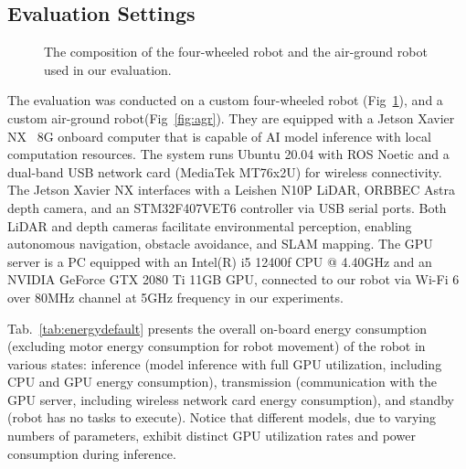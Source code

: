 \subsection{Evaluation Settings}

\begin{figure}[!t]
    \centering
    \hfil
    \caption{The composition of the four-wheeled robot and the air-ground robot used in our evaluation.}
    \label{fig:robot}
\end{figure}

The evaluation was conducted on a custom four-wheeled robot (Fig~\ref{fig:robot}), and a custom air-ground robot(Fig~\ref{fig:agr}).
They are equipped with a Jetson Xavier NX~\cite{jetsonnx} 8G onboard computer that is capable of AI model inference with local computation resources. 
The system runs Ubuntu 20.04 with ROS Noetic and a dual-band USB network card (MediaTek MT76x2U) for wireless connectivity. 
The Jetson Xavier NX interfaces with a Leishen N10P LiDAR, ORBBEC Astra depth camera, and an STM32F407VET6 controller via USB serial ports. 
Both LiDAR and depth cameras facilitate environmental perception, enabling autonomous navigation, obstacle avoidance, and SLAM mapping. 
The GPU server is a PC equipped with an Intel(R) i5 12400f CPU @ 4.40GHz and an NVIDIA GeForce GTX 2080 Ti 11GB GPU, connected to our robot via Wi-Fi 6 over 80MHz channel at 5GHz frequency in our experiments.

Tab.~\ref{tab:energydefault} presents the overall on-board energy consumption (excluding motor energy consumption for robot movement) of the robot in various states: inference (model inference with full GPU utilization, including CPU and GPU energy consumption), transmission (communication with the GPU server, including wireless network card energy consumption), and standby (robot has no tasks to execute).
Notice that different models, due to varying numbers of parameters, exhibit distinct GPU utilization rates and power consumption during inference. 

